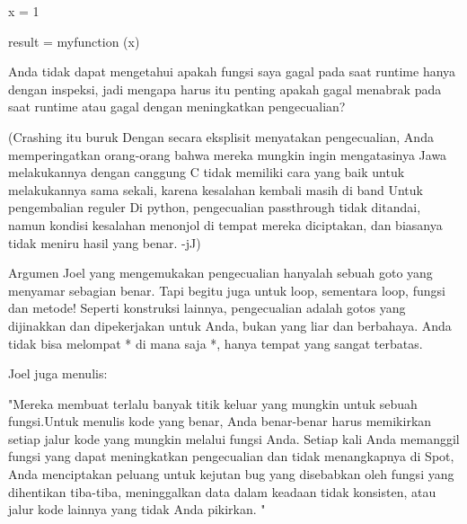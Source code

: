 \vspace{12pt}

\vspace{12pt}

x = 1 

result = myfunction (x) 
\vspace{20pt}

 \hspace*{0.64in} Anda tidak dapat mengetahui apakah fungsi saya gagal pada saat runtime hanya dengan inspeksi, jadi mengapa harus itu penting apakah gagal menabrak pada saat runtime atau gagal dengan meningkatkan pengecualian? 
 
\vspace{12pt}
 
(Crashing itu buruk Dengan secara eksplisit menyatakan pengecualian, Anda memperingatkan orang-orang bahwa mereka mungkin ingin mengatasinya Jawa melakukannya dengan canggung C tidak memiliki cara yang baik untuk melakukannya sama sekali, karena kesalahan kembali masih di band Untuk pengembalian reguler Di python, pengecualian passthrough tidak ditandai, namun kondisi kesalahan menonjol di tempat mereka diciptakan, dan biasanya tidak meniru hasil yang benar. -jJ)

 \hspace*{0.64in} Argumen Joel yang mengemukakan pengecualian hanyalah sebuah goto yang menyamar sebagian benar. Tapi begitu juga untuk loop, sementara loop, fungsi dan metode! Seperti konstruksi lainnya, pengecualian adalah gotos yang dijinakkan dan dipekerjakan untuk Anda, bukan yang liar dan berbahaya. Anda tidak bisa melompat * di mana saja *, hanya tempat yang sangat terbatas. 
 
\vspace{12pt}

Joel juga menulis: 

\vspace{12pt}
 
 \hspace*{0.64in} "Mereka membuat terlalu banyak titik keluar yang mungkin untuk sebuah fungsi.Untuk menulis kode yang benar, Anda benar-benar harus memikirkan setiap jalur kode yang mungkin melalui fungsi Anda. Setiap kali Anda memanggil fungsi yang dapat meningkatkan pengecualian dan tidak menangkapnya di Spot, Anda menciptakan peluang untuk kejutan bug yang disebabkan oleh fungsi yang dihentikan tiba-tiba, meninggalkan data dalam keadaan tidak konsisten, atau jalur kode lainnya yang tidak Anda pikirkan. " 
 
\vspace{12pt}
 
